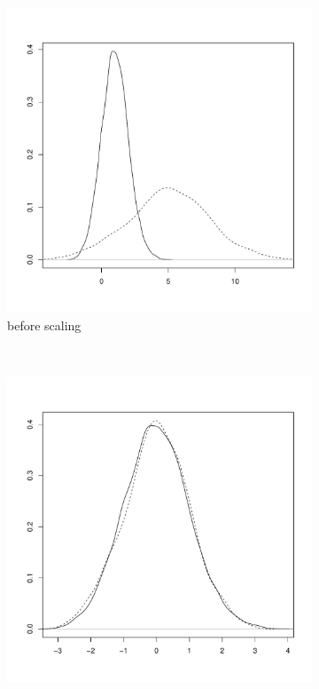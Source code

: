 \begin{figure}[ht]
\begin{subfigure}[b]{.5\textwidth}
\centering
\includegraphics[scale=.4]{figures/normalisation-scaled-a.pdf} 
\caption{before scaling}
\end{subfigure}
~
\begin{subfigure}[b]{.5\textwidth}
\centering
\includegraphics[scale=.4]{figures/normalisation-scaled-b.pdf} 

\end{subfigure}
\end{figure}
